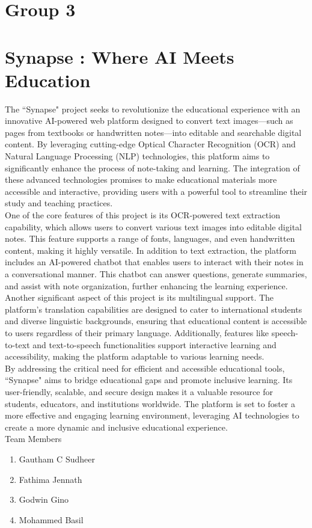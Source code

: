 \documentclass[12pt]{book}
\begin{document}
	\thispagestyle{empty}
	\section*{Group 3}
	\section*{Synapse : Where AI Meets Education}
	The ``Synapse" project seeks to revolutionize the educational experience with an innovative AI-powered web platform designed to convert text images—such as pages from textbooks or handwritten notes—into editable and searchable digital content. By leveraging cutting-edge Optical Character Recognition (OCR) and Natural Language Processing (NLP) technologies, this platform aims to significantly enhance the process of note-taking and learning. The integration of these advanced technologies promises to make educational materials more accessible and interactive, providing users with a powerful tool to streamline their study and teaching practices.\\
	
	One of the core features of this project is its OCR-powered text extraction capability, which allows users to convert various text images into editable digital notes. This feature supports a range of fonts, languages, and even handwritten content, making it highly versatile. In addition to text extraction, the platform includes an AI-powered chatbot that enables users to interact with their notes in a conversational manner. This chatbot can answer questions, generate summaries, and assist with note organization, further enhancing the learning experience. Another significant aspect of this project is its multilingual support. The platform’s translation capabilities are designed to cater to international students and diverse linguistic backgrounds, ensuring that educational content is accessible to users regardless of their primary language. Additionally, features like speech-to-text and text-to-speech functionalities support interactive learning and accessibility, making the platform adaptable to various learning needs.\\
	
	By addressing the critical need for efficient and accessible educational tools, ``Synapse" aims to bridge educational gaps and promote inclusive learning. Its user-friendly, scalable, and secure design makes it a valuable resource for students, educators, and institutions worldwide. The platform is set to foster a more effective and engaging learning environment, leveraging AI technologies to create a more dynamic and inclusive educational experience.\\
	
	\bigskip
	Team Members
	\begin{enumerate}
		\item Gautham C Sudheer
		\item Fathima Jennath
		\item Godwin Gino
		\item Mohammed Basil
	\end{enumerate}
	\bigskip
	
\end{document}
